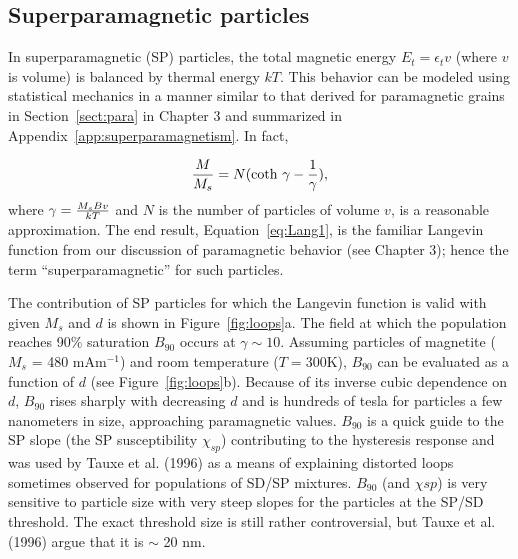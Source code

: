 \subsection {Superparamagnetic particles}
\label{sect:SP}

In 
superparamagnetic (SP) particles, the total magnetic energy $E_t=\epsilon_tv$ (where $v$ is volume) is balanced by thermal energy $kT$.  This behavior can be modeled using statistical mechanics  in a manner similar to that derived for paramagnetic grains in Section~\ref{sect:para} in Chapter 3 and summarized in Appendix~\ref{app:superparamagnetism}.  In fact, 


\begin{equation}
{M\over {M_s}} =
{ N(\hbox{coth }\gamma -
{
1\over{\gamma}
}), 
}
\label{eq:Lang1} 
\end{equation}
\noindent where $\gamma = { {M_sBv}\over {kT}} $ and $N$ is the number of particles of volume $v$, 
 is a reasonable approximation. 
The end result, Equation~\ref{eq:Lang1}, is the familiar 
Langevin function from our discussion of  paramagnetic behavior (see Chapter  3); hence
the   term ``superparamagnetic'' for such particles.

 



The
contribution of SP particles for which the Langevin function is valid with given $M_s$ and $d$ is shown in Figure~\ref{fig:loops}a.
The field at which the population reaches 90\%
saturation $B_{90}$ occurs at $\gamma \sim 10$.  
Assuming particles of magnetite ($M_s$ = 480 mAm$^{-1}$) and room temperature 
($T=300$\deg K), $B_{90}$ can
be evaluated as a function of $d$ (see Figure~\ref{fig:loops}b). 
Because of its inverse cubic dependence on $d$, $B_{90}$ rises sharply with decreasing $d$ and is
hundreds of tesla for particles a few nanometers in size, approaching paramagnetic
values.    $B_{90}$ is a quick guide to the  SP slope (the SP susceptibility $\chi_{sp}$) contributing to the hysteresis response and was  used by Tauxe et al. (1996) \nocite{tauxe96} as a means of explaining distorted loops sometimes observed for populations of SD/SP mixtures.   $B_{90}$ (and $\chi{sp}$) is  very sensitive to particle size with very steep slopes for the particles at the SP/SD threshold.   The exact threshold size 
is still rather controversial, but Tauxe et al. (1996) argue that it is $\sim $ 20 nm. 
\eject

